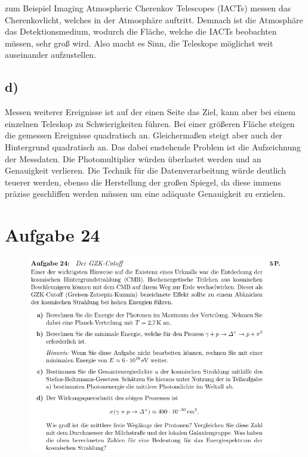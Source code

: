     \justifying zum Beispiel Imaging Atmospheric Cherenkov Telescopes (IACTs) messen das Cherenkovlicht, welches in der 
    Atmosphäre auftritt. Demnach ist die Atmosphäre das Detektionsmedium, wodurch die Fläche, welche die IACTs beobachten müssen, sehr groß
    wird. Also macht es Sinn, die Teleskope möglichst weit auseinander aufzustellen.  

\subsection{d)}

    \justifying Messen weiterer Ereignisse ist auf der einen Seite das Ziel, kann aber bei einem einzelnen Teleskop zu Schwierigkeiten
    führen. Bei einer größeren Fläche steigen die gemessen Ereignisse quadratisch an. Gleichermaßen steigt aber auch der Hintergrund quadratisch an. 
    Das dabei enstehende Problem ist die Aufzeichnung der Messdaten. Die Photomultiplier würden überlastet werden und an Genauigkeit verlieren. Die
    Technik für die Datenverarbeitung würde deutlich teuerer werden, ebenso die Herstellung der großen Spiegel, da diese immens präzise geschliffen werden 
    müssen um eine adäquate Genauigkeit zu erzielen. 

\section{Aufgabe 24}

    \begin{figure}[H]
        \centering
        \includegraphics[width=\textwidth]{images/Aufgabe24.jpg}
        \label{fig:5}
    \end{figure}

